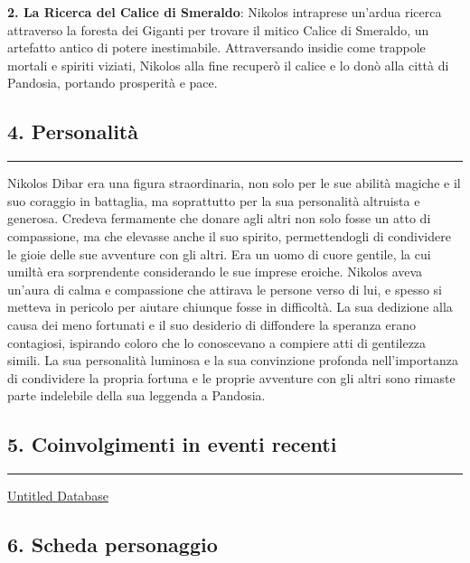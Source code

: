 \textbf{2. La Ricerca del Calice di Smeraldo}: Nikolos intraprese
un'ardua ricerca attraverso la foresta dei Giganti per trovare il mitico
Calice di Smeraldo, un artefatto antico di potere inestimabile.
Attraversando insidie come trappole mortali e spiriti viziati, Nikolos
alla fine recuperò il calice e lo donò alla città di Pandosia, portando
prosperità e pace.

\subsection{4. Personalità}\label{personalituxe0}

\begin{center}\rule{0.5\linewidth}{0.5pt}\end{center}

Nikolos Dibar era una figura straordinaria, non solo per le sue abilità
magiche e il suo coraggio in battaglia, ma soprattutto per la sua
personalità altruista e generosa. Credeva fermamente che donare agli
altri non solo fosse un atto di compassione, ma che elevasse anche il
suo spirito, permettendogli di condividere le gioie delle sue avventure
con gli altri. Era un uomo di cuore gentile, la cui umiltà era
sorprendente considerando le sue imprese eroiche. Nikolos aveva un'aura
di calma e compassione che attirava le persone verso di lui, e spesso si
metteva in pericolo per aiutare chiunque fosse in difficoltà. La sua
dedizione alla causa dei meno fortunati e il suo desiderio di diffondere
la speranza erano contagiosi, ispirando coloro che lo conoscevano a
compiere atti di gentilezza simili. La sua personalità luminosa e la sua
convinzione profonda nell'importanza di condividere la propria fortuna e
le proprie avventure con gli altri sono rimaste parte indelebile della
sua leggenda a Pandosia.

\subsection{5. Coinvolgimenti in eventi
recenti}\label{coinvolgimenti-in-eventi-recenti}

\begin{center}\rule{0.5\linewidth}{0.5pt}\end{center}

\href{Untitled\%20Database\%209a5498962e7a40fc8064d94e70ceaf1c.csv}{Untitled
Database}

\subsection{6. Scheda personaggio}\label{scheda-personaggio}

